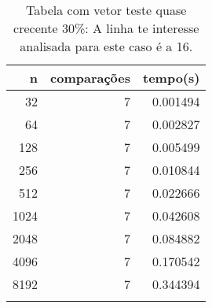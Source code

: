 \begin{table}[ht]
\centering
\begin{tabular}{rrr} \toprule
        n &    comparações &       tempo(s) \\ \midrule
      32  &              7 &      0.001494 \\
      64  &              7 &      0.002827 \\
     128  &              7 &      0.005499 \\
     256  &              7 &      0.010844 \\
     512  &              7 &      0.022666 \\
    1024  &              7 &      0.042608 \\
    2048  &              7 &      0.084882 \\
    4096  &              7 &      0.170542 \\
    8192  &              7 &      0.344394 \\
\bottomrule\addlinespace
\end{tabular}
\caption{Tabela com vetor teste quase crecente 30\%: A linha te interesse analisada para este caso é a 16.}
\label{tab:radixsortQuaseCresc30}
\end{table}
